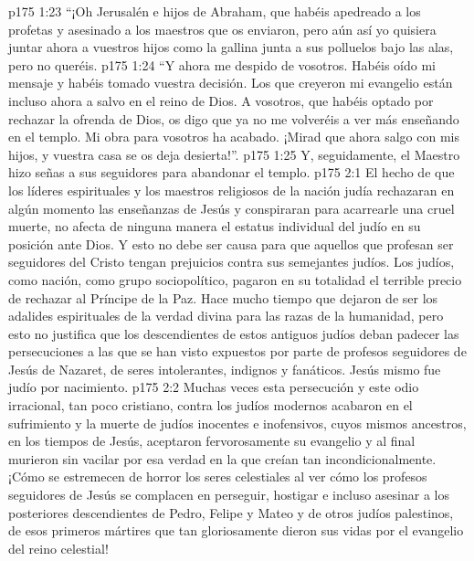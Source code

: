 \vs p175 1:23 “¡Oh Jerusalén e hijos de Abraham, que habéis apedreado a los profetas y asesinado a los maestros que os enviaron, pero aún así yo quisiera juntar ahora a vuestros hijos como la gallina junta a sus polluelos bajo las alas, pero no queréis.
\vs p175 1:24 “Y ahora me despido de vosotros. Habéis oído mi mensaje y habéis tomado vuestra decisión. Los que creyeron mi evangelio están incluso ahora a salvo en el reino de Dios. A vosotros, que habéis optado por rechazar la ofrenda de Dios, os digo que ya no me volveréis a ver más enseñando en el templo. Mi obra para vosotros ha acabado. ¡Mirad que ahora salgo con mis hijos, y vuestra casa se os deja desierta!”.
\vs p175 1:25 Y, seguidamente, el Maestro hizo señas a sus seguidores para abandonar el templo.
\vs p175 2:1 El hecho de que los líderes espirituales y los maestros religiosos de la nación judía rechazaran en algún momento las enseñanzas de Jesús y conspiraran para acarrearle una cruel muerte, no afecta de ninguna manera el estatus individual del judío en su posición ante Dios. Y esto no debe ser causa para que aquellos que profesan ser seguidores del Cristo tengan prejuicios contra sus semejantes judíos. Los judíos, como nación, como grupo sociopolítico, pagaron en su totalidad el terrible precio de rechazar al Príncipe de la Paz. Hace mucho tiempo que dejaron de ser los adalides espirituales de la verdad divina para las razas de la humanidad, pero esto no justifica que los descendientes de estos antiguos judíos deban padecer las persecuciones a las que se han visto expuestos por parte de profesos seguidores de Jesús de Nazaret, de seres intolerantes, indignos y fanáticos. Jesús mismo fue judío por nacimiento.
\vs p175 2:2 Muchas veces esta persecución y este odio irracional, tan poco cristiano, contra los judíos modernos acabaron en el sufrimiento y la muerte de judíos inocentes e inofensivos, cuyos mismos ancestros, en los tiempos de Jesús, aceptaron fervorosamente su evangelio y al final murieron sin vacilar por esa verdad en la que creían tan incondicionalmente. ¡Cómo se estremecen de horror los seres celestiales al ver cómo los profesos seguidores de Jesús se complacen en perseguir, hostigar e incluso asesinar a los posteriores descendientes de Pedro, Felipe y Mateo y de otros judíos palestinos, de esos primeros mártires que tan gloriosamente dieron sus vidas por el evangelio del reino celestial!

